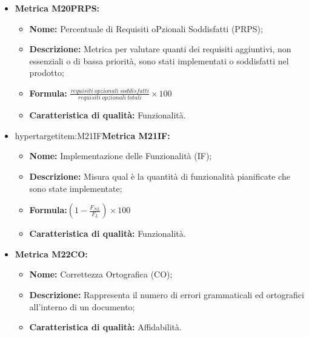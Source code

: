 \begin{itemize}
    \item \hypertarget{item:M20PRPS}{\textbf{Metrica M20PRPS:}}
    \begin{minipage}[t]{0.9\textwidth}
        \begin{itemize}
            \item \textbf{Nome:} Percentuale di Requisiti oPzionali Soddisfatti (PRPS);
            \item \textbf{Descrizione:} Metrica per valutare quanti dei requisiti aggiuntivi, non essenziali o di bassa priorità, sono stati implementati o soddisfatti nel prodotto;
            \item \textbf{Formula:} $\frac{requisiti \ opzionali \ soddisfatti}{requisiti \ opzionali \ totali}\times 100$
            \item \textbf{Caratteristica di qualità:} Funzionalità.
        \end{itemize}
    \end{minipage}

    \item hypertarget{item:M21IF}{\textbf{Metrica M21IF:}}
    \begin{minipage}[t]{0.9\textwidth}
                  \begin{itemize}
                      \item \textbf{Nome:} Implementazione delle Funzionalità (IF);
                      \item \textbf{Descrizione:} Misura qual è la quantità di funzionalità pianificate che sono state implementate;
                      \item \textbf{Formula:}$(1 - \frac{F_{NL}}{F_L}) \times 100$
                      \item \textbf{Caratteristica di qualità:} Funzionalità.
                  \end{itemize}
                \end{minipage}

    \item \hypertarget{item:M22CO}{\textbf{Metrica M22CO:}}
    \begin{minipage}[t]{0.9\textwidth}
          \begin{itemize}
              \item \textbf{Nome:} Correttezza Ortografica (CO);
              \item \textbf{Descrizione:} Rappresenta il numero di errori grammaticali ed ortografici all'interno di un documento;
              \item \textbf{Caratteristica di qualità:} Affidabilità.
          \end{itemize}
        \end{minipage}


\end{itemize}
